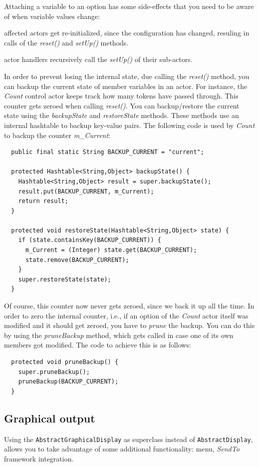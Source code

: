Attaching a variable to an option has some side-effects that you need to be 
aware of when variable values change:
\begin{tight_itemize}
	\item affected actors get re-initialized, since the configuration has 
	changed, resuling in calls of the \textit{reset()} and \textit{setUp()} 
	methods.
	\item actor handlers recursively call the \textit{setUp()} of their 
	sub-actors.
\end{tight_itemize}
In order to prevent losing the internal state, due calling the \textit{reset()}
method, you can backup the current state of member variables in an actor. For
instance, the \textit{Count} control actor keeps track how many tokens have 
passed through. This counter gets zeroed when calling \textit{reset()}. You can 
backup/restore the current state using the \textit{backupState} and 
\textit{restoreState} methods. These methods use an internal hashtable to backup
key-value pairs. The following code is used by \textit{Count} to backup the 
counter \textit{m\_Current}:
{\small
\begin{verbatim}
  public final static String BACKUP_CURRENT = "current";

  protected Hashtable<String,Object> backupState() {
    Hashtable<String,Object> result = super.backupState();
    result.put(BACKUP_CURRENT, m_Current);
    return result;
  }

  protected void restoreState(Hashtable<String,Object> state) {
    if (state.containsKey(BACKUP_CURRENT)) {
      m_Current = (Integer) state.get(BACKUP_CURRENT);
      state.remove(BACKUP_CURRENT);
    }
    super.restoreState(state);
  }
\end{verbatim}
}
Of course, this counter now never gets zeroed, since we back it up all the time.
In order to zero the internal counter, i.e., if an option of the \textit{Count} 
actor itself was modified and it should get zeroed, you have to \textit{prune}
the backup. You can do this by using the \textit{pruneBackup} method, which gets 
called in case one of its own members got modified. The code to achieve this is 
as follows:
{\small
\begin{verbatim}
  protected void pruneBackup() {
    super.pruneBackup();
    pruneBackup(BACKUP_CURRENT);
  }
\end{verbatim}
}

\subsection{Graphical output}
Using the \texttt{AbstractGraphicalDisplay} as superclass instead of
\texttt{AbstractDisplay}, allows you to take advantage of some additional
functionality: menu, \textit{SendTo} framework integration.

